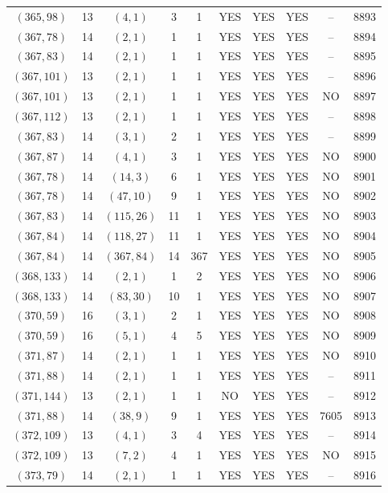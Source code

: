 \begin{longtable}{|c|c|c|c|c|c|c|c|c|c|}
$(365, 98)$ & 13 & $(4, 1)$ & 3 & 1 & YES & YES & YES & -- & 8893\\
$(367, 78)$ & 14 & $(2, 1)$ & 1 & 1 & YES & YES & YES & -- & 8894\\
$(367, 83)$ & 14 & $(2, 1)$ & 1 & 1 & YES & YES & YES & -- & 8895\\
$(367, 101)$ & 13 & $(2, 1)$ & 1 & 1 & YES & YES & YES & -- & 8896\\
$(367, 101)$ & 13 & $(2, 1)$ & 1 & 1 & YES & YES & YES & NO & 8897\\
$(367, 112)$ & 13 & $(2, 1)$ & 1 & 1 & YES & YES & YES & -- & 8898\\
$(367, 83)$ & 14 & $(3, 1)$ & 2 & 1 & YES & YES & YES & -- & 8899\\
$(367, 87)$ & 14 & $(4, 1)$ & 3 & 1 & YES & YES & YES & NO & 8900\\
$(367, 78)$ & 14 & $(14, 3)$ & 6 & 1 & YES & YES & YES & NO & 8901\\
$(367, 78)$ & 14 & $(47, 10)$ & 9 & 1 & YES & YES & YES & NO & 8902\\
$(367, 83)$ & 14 & $(115, 26)$ & 11 & 1 & YES & YES & YES & NO & 8903\\
$(367, 84)$ & 14 & $(118, 27)$ & 11 & 1 & YES & YES & YES & NO & 8904\\
$(367, 84)$ & 14 & $(367, 84)$ & 14 & 367 & YES & YES & YES & NO & 8905\\
$(368, 133)$ & 14 & $(2, 1)$ & 1 & 2 & YES & YES & YES & NO & 8906\\
$(368, 133)$ & 14 & $(83, 30)$ & 10 & 1 & YES & YES & YES & NO & 8907\\
$(370, 59)$ & 16 & $(3, 1)$ & 2 & 1 & YES & YES & YES & NO & 8908\\
$(370, 59)$ & 16 & $(5, 1)$ & 4 & 5 & YES & YES & YES & NO & 8909\\
$(371, 87)$ & 14 & $(2, 1)$ & 1 & 1 & YES & YES & YES & NO & 8910\\
$(371, 88)$ & 14 & $(2, 1)$ & 1 & 1 & YES & YES & YES & -- & 8911\\
$(371, 144)$ & 13 & $(2, 1)$ & 1 & 1 & NO & YES & YES & -- & 8912\\
$(371, 88)$ & 14 & $(38, 9)$ & 9 & 1 & YES & YES & YES & 7605 & 8913\\
$(372, 109)$ & 13 & $(4, 1)$ & 3 & 4 & YES & YES & YES & -- & 8914\\
$(372, 109)$ & 13 & $(7, 2)$ & 4 & 1 & YES & YES & YES & NO & 8915\\
$(373, 79)$ & 14 & $(2, 1)$ & 1 & 1 & YES & YES & YES & -- & 8916\\

\end{longtable}
